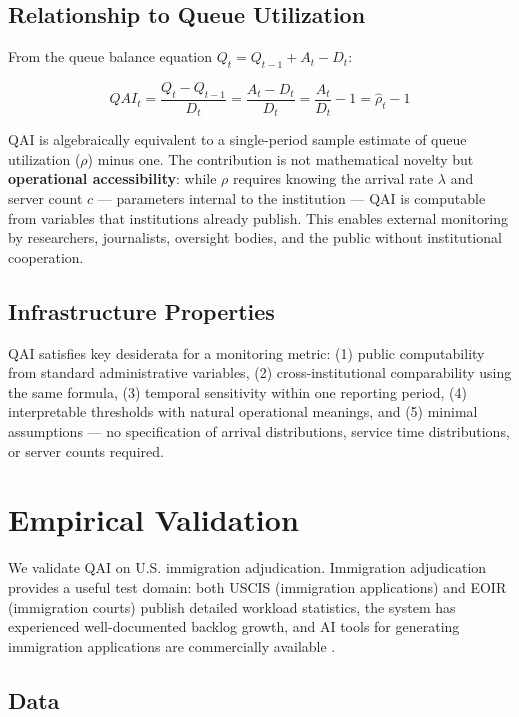 \documentclass{article}
\begin{document}
\subsection{Relationship to Queue Utilization}

From the queue balance equation $Q_t = Q_{t-1} + A_t - D_t$:

\begin{equation}
QAI_t = \frac{Q_t - Q_{t-1}}{D_t} = \frac{A_t - D_t}{D_t} = \frac{A_t}{D_t} - 1 = \hat{\rho}_t - 1
\end{equation}

QAI is algebraically equivalent to a single-period sample estimate of queue utilization ($\rho$) minus one. The contribution is not mathematical novelty but \textbf{operational accessibility}: while $\rho$ requires knowing the arrival rate $\lambda$ and server count $c$ — parameters internal to the institution — QAI is computable from variables that institutions already publish. This enables external monitoring by researchers, journalists, oversight bodies, and the public without institutional cooperation.

\subsection{Infrastructure Properties}

QAI satisfies key desiderata for a monitoring metric: (1) public computability from standard administrative variables, (2) cross-institutional comparability using the same formula, (3) temporal sensitivity within one reporting period, (4) interpretable thresholds with natural operational meanings, and (5) minimal assumptions — no specification of arrival distributions, service time distributions, or server counts required.

\section{Empirical Validation}

We validate QAI on U.S. immigration adjudication. Immigration adjudication provides a useful test domain: both USCIS (immigration applications) and EOIR (immigration courts) publish detailed workload statistics, the system has experienced well-documented backlog growth, and AI tools for generating immigration applications are commercially available \cite{chin-rothmann2024}.

\subsection{Data}
\end{document}
